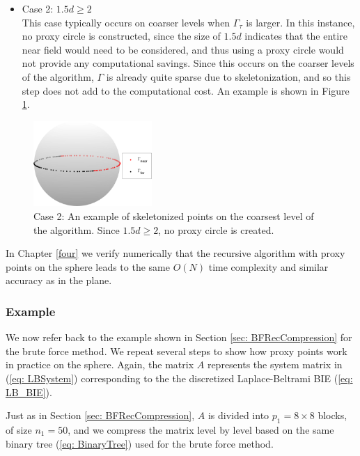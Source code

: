 \documentclass{sfuthesis}
\begin{document}
\begin{itemize}
\item Case 2: $1.5d\geq 2$\\
This case typically occurs on coarser levels when $\Gamma_\tau$ is larger. In this instance, no proxy circle is constructed, since the size of $1.5d$ indicates that the entire near field would need to be considered, and thus using a proxy circle would not provide any computational savings. Since this occurs on the coarser levels of the algorithm, $\Gamma$ is already quite sparse due to skeletonization, and so this step does not add to the computational cost. An example is shown in Figure \ref{fig: Case2}.  
\end{itemize}

\begin{figure}
	\centering
  	\includegraphics[width=0.4\textwidth]{Case2ProxyEx}
	 \caption{Case 2: An example of skeletonized points on the coarsest level of the algorithm. Since $1.5d\geq2$, no proxy circle is created.}
	 \label{fig: Case2}
\end{figure}
 
In Chapter \ref{four} we verify numerically that the recursive algorithm with proxy points on the sphere leads to the same $O(N)$ time complexity and similar accuracy as in the plane. 

\subsubsection{Example}
We now refer back to the example shown in Section \ref{sec: BFRecCompression} for the brute force method. We repeat several steps to show how proxy points work in practice on the sphere. 
Again, the matrix $A$ represents the system matrix in (\ref{eq: LBSystem}) corresponding to the the discretized Laplace-Beltrami BIE (\ref{eq: LB_BIE}). 

Just as in Section \ref{sec: BFRecCompression}, $A$ is divided into $p_1=8 \times 8$ blocks, of size $n_1=50$, and we compress the matrix level by level based on the same binary tree (\ref{eq: BinaryTree}) used for the brute force method. 
\end{document}
